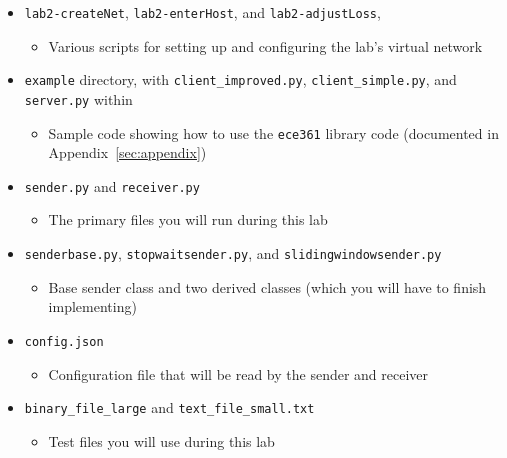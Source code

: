 \documentclass[11pt]{article}
\begin{document}
\begin{itemize}
    \item \texttt{lab2-createNet}, \texttt{lab2-enterHost}, and \texttt{lab2-adjustLoss},
        \begin{itemize}
            \item Various scripts for setting up and configuring the lab's virtual network
        \end{itemize}

    \item \texttt{example} directory, with \texttt{client\_improved.py}, \texttt{client\_simple.py}, and \texttt{server.py} within
        \begin{itemize}
            \item Sample code showing how to use the \texttt{ece361} library code (documented in Appendix~\ref{sec:appendix})
        \end{itemize}

    \item \texttt{sender.py} and \texttt{receiver.py}
        \begin{itemize}
            \item The primary files you will run during this lab
        \end{itemize}

    \item \texttt{senderbase.py}, \texttt{stopwaitsender.py}, and \texttt{slidingwindowsender.py}
        \begin{itemize}
            \item Base sender class and two derived classes (which you will have to finish implementing)
        \end{itemize}

    \item \texttt{config.json}
        \begin{itemize}
            \item Configuration file that will be read by the sender and receiver
        \end{itemize}

    \item \texttt{binary\_file\_large} and \texttt{text\_file\_small.txt}
        \begin{itemize}
            \item Test files you will use during this lab
        \end{itemize}
\end{itemize}

\end{document}
